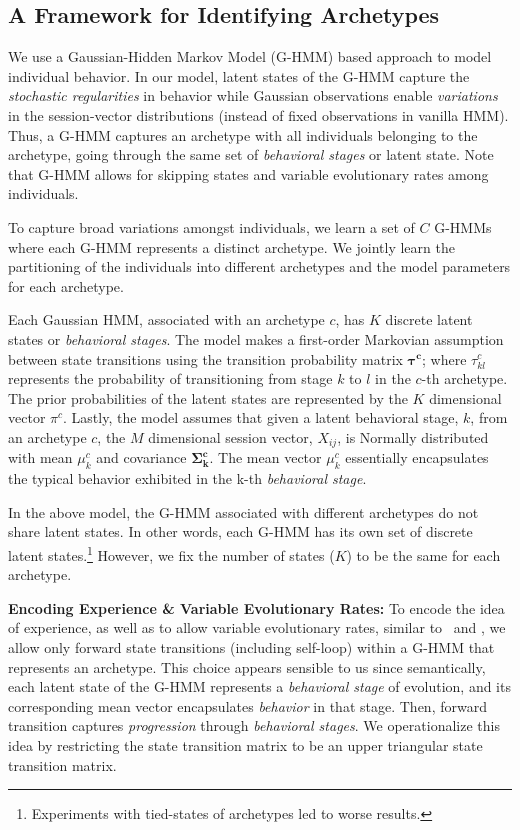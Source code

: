 \documentclass[10pt,letterpaper]{article}
\begin{document}
\subsection*{A Framework for Identifying Archetypes}
\label{subsec:GHMMCluster}
We use a Gaussian-Hidden Markov Model (G-HMM) based approach to model individual behavior.
In our model, latent states of the G-HMM capture the \emph{stochastic regularities} in behavior while Gaussian observations enable \emph{variations} in the session-vector distributions (instead of fixed observations in vanilla HMM). Thus, a G-HMM captures an archetype with all individuals belonging to the archetype, going through the same set of \emph{behavioral stages} or latent state. Note that G-HMM allows for skipping states and variable evolutionary rates among individuals.

To capture broad variations amongst individuals, we learn a set of  $C$ G-HMMs where each G-HMM represents a distinct archetype. We jointly learn the partitioning of the individuals into different archetypes and the model parameters for each archetype.

Each Gaussian HMM, associated with an archetype $c$, has $K$ discrete latent states or \emph{behavioral stages}. The model makes a first-order Markovian assumption between state transitions using the transition probability matrix $\mathbf{{\tau}^{c}}$; where $\tau_{kl}^{c}$ represents the probability of transitioning from stage $k$ to $l$ in the $c$-th archetype. The prior probabilities of the latent states are represented by the $K$ dimensional vector $\pi^{c}$. Lastly, the model assumes that given a latent behavioral stage, $k$, from an archetype $c$, the $M$ dimensional session vector, $X_{ij}$, is Normally distributed with mean $\mu_{k}^{c}$ and covariance $\mathbf{{\Sigma}_k^{c}}$. The mean vector $\mu_{k}^{c}$ essentially encapsulates the typical behavior exhibited in the k-th \emph{behavioral stage}.

In the above model, the G-HMM associated with different archetypes do not share latent states. In other words, each G-HMM has its own set of discrete latent states.\footnote{ Experiments with tied-states of archetypes led to worse results.} However, we fix the number of states ($K$) to be the same for each archetype.

\textbf{Encoding Experience \& Variable Evolutionary Rates: }
To encode the idea of experience, as well as to allow variable evolutionary rates, similar to~\cite{Yang:2014} and \cite{Knab2003}, we allow only forward state transitions (including self-loop) within a G-HMM that represents an archetype. This choice appears sensible to us since semantically, each latent state of the G-HMM represents a \emph{behavioral stage} of evolution, and its corresponding mean vector encapsulates \emph{behavior} in that stage. Then, forward transition captures \emph{progression} through \emph{behavioral stages}. We operationalize this idea by restricting the state transition matrix to be an upper triangular state transition matrix.
\end{document}

